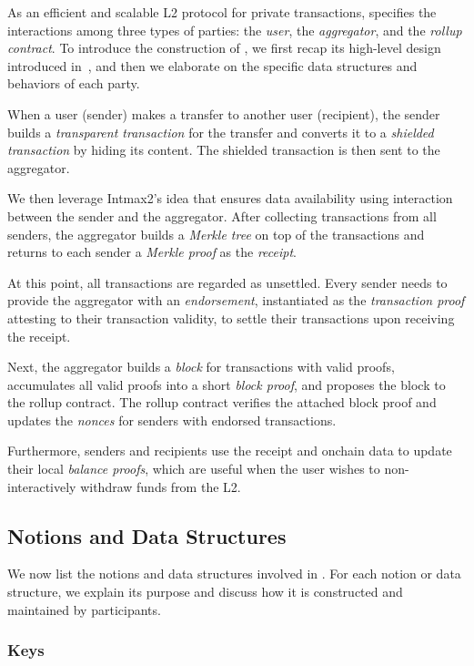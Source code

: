 As an efficient and scalable \ac{L2} protocol for private transactions, \Protocol specifies the interactions among three types of parties: the \textit{user}, the \textit{aggregator}, and the \textit{rollup contract}.
To introduce the construction of \Protocol, we first recap its high-level design introduced in~, and then we elaborate on the specific data structures and behaviors of each party.

When a user (sender) makes a transfer to another user (recipient), the sender builds a \textit{transparent transaction} for the transfer and converts it to a \textit{shielded transaction} by hiding its content.
The shielded transaction is then sent to the aggregator.

We then leverage Intmax2's idea that ensures data availability using interaction between the sender and the aggregator.
After collecting transactions from all senders, the aggregator builds a \textit{Merkle tree} on top of the transactions and returns to each sender a \textit{Merkle proof} as the \textit{receipt}.

At this point, all transactions are regarded as unsettled.
Every sender needs to provide the aggregator with an \textit{endorsement}, instantiated as the \textit{transaction proof} attesting to their transaction validity, to settle their transactions upon receiving the receipt.

Next, the aggregator builds a \textit{block} for transactions with valid proofs, accumulates all valid proofs into a short \textit{block proof}, and proposes the block to the rollup contract.
The rollup contract verifies the attached block proof and updates the \textit{nonces} for senders with endorsed transactions.

Furthermore, senders and recipients use the receipt and onchain data to update their local \textit{balance proofs}, which are useful when the user wishes to non-interactively withdraw funds from the L2.

\subsection{Notions and Data Structures}

We now list the notions and data structures involved in \Protocol.
For each notion or data structure, we explain its purpose and discuss how it is constructed and maintained by \Protocol participants.

\subsubsection{Keys}

